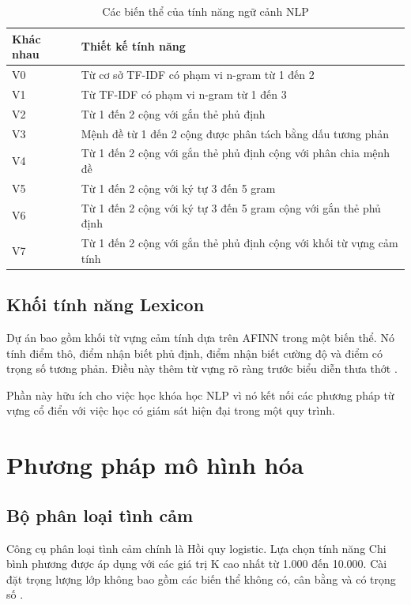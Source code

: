 \documentclass[12pt,a4paper]{article}
\begin{document}
\begin{table}[H]
\centering
\caption{Các biến thể của tính năng ngữ cảnh NLP}
\label{tab:nlp_variant_design}
\begin{tabular}{>{\raggedright\arraybackslash}p{1.2cm} >{\raggedright\arraybackslash}p{12cm}}
\toprule
Khác nhau & Thiết kế tính năng \\
\midrule
V0 & Từ cơ sở TF-IDF có phạm vi n-gram từ 1 đến 2 \\
V1 & Từ TF-IDF có phạm vi n-gram từ 1 đến 3 \\
V2 & Từ 1 đến 2 cộng với gắn thẻ phủ định \\
V3 & Mệnh đề từ 1 đến 2 cộng được phân tách bằng dấu tương phản \\
V4 & Từ 1 đến 2 cộng với gắn thẻ phủ định cộng với phân chia mệnh đề \\
V5 & Từ 1 đến 2 cộng với ký tự 3 đến 5 gram \\
V6 & Từ 1 đến 2 cộng với ký tự 3 đến 5 gram cộng với gắn thẻ phủ định \\
V7 & Từ 1 đến 2 cộng với gắn thẻ phủ định cộng với khối từ vựng cảm tính \\
\bottomrule
\end{tabular}
\end{table}

\subsection{Khối tính năng Lexicon}
Dự án bao gồm khối từ vựng cảm tính dựa trên AFINN trong một biến thể. Nó tính điểm thô, điểm nhận biết phủ định, điểm nhận biết cường độ và điểm có trọng số tương phản. Điều này thêm từ vựng rõ ràng trước biểu diễn thưa thớt \cite{nielsen2011}.

Phần này hữu ích cho việc học khóa học NLP vì nó kết nối các phương pháp từ vựng cổ điển với việc học có giám sát hiện đại trong một quy trình.

\section{Phương pháp mô hình hóa}
\subsection{Bộ phân loại tình cảm}
Công cụ phân loại tình cảm chính là Hồi quy logistic. Lựa chọn tính năng Chi bình phương được áp dụng với các giá trị K cao nhất từ 1.000 đến 10.000. Cài đặt trọng lượng lớp không bao gồm các biến thể không có, cân bằng và có trọng số \cite{forman2003}.
\end{document}
